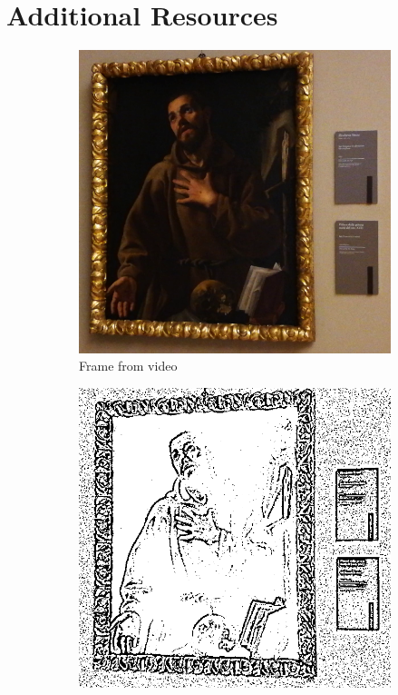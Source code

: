 \section*{Additional Resources}

\begin{figure}[ht!]
  \centering
      \begin{subfigure}[t]{0.3\textwidth}
        \includegraphics[width=\linewidth]{pictures/painting_detection/Frame.png}
        \caption*{Frame from video}\label{fig:Frame}
      \end{subfigure}\hfill
      \begin{subfigure}[t]{0.3\textwidth}
        \includegraphics[width=\linewidth]{pictures/painting_detection/2-adaptive_threshold.PNG}

\end{subfigure}
\end{figure}
